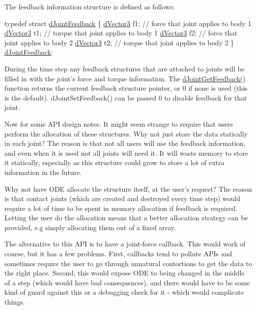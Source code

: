 The feedback information structure is defined as follows:

typedef struct \hyperlink{struct_tao_1_1_ode_1_1_ode_1_1d_joint_feedback}{dJointFeedback} \{ \hyperlink{struct_tao_1_1_ode_1_1_ode_1_1d_vector3}{dVector3} f1; // force that joint applies to body 1 \hyperlink{struct_tao_1_1_ode_1_1_ode_1_1d_vector3}{dVector3} t1; // torque that joint applies to body 1 \hyperlink{struct_tao_1_1_ode_1_1_ode_1_1d_vector3}{dVector3} f2; // force that joint applies to body 2 \hyperlink{struct_tao_1_1_ode_1_1_ode_1_1d_vector3}{dVector3} t2; // torque that joint applies to body 2 \} \hyperlink{struct_tao_1_1_ode_1_1_ode_1_1d_joint_feedback}{dJointFeedback};

During the time step any feedback structures that are attached to joints will be filled in with the joint's force and torque information. The \hyperlink{namespace_tao_1_1_ode_acb665b0ad53713bdc6095725a790aa80}{dJointGetFeedback()} function returns the current feedback structure pointer, or 0 if none is used (this is the default). dJointSetFeedback() can be passed 0 to disable feedback for that joint.

Now for some API design notes. It might seem strange to require that users perform the allocation of these structures. Why not just store the data statically in each joint? The reason is that not all users will use the feedback information, and even when it is used not all joints will need it. It will waste memory to store it statically, especially as this structure could grow to store a lot of extra information in the future.

Why not have ODE allocate the structure itself, at the user's request? The reason is that contact joints (which are created and destroyed every time step) would require a lot of time to be spent in memory allocation if feedback is required. Letting the user do the allocation means that a better allocation strategy can be provided, e.g simply allocating them out of a fixed array.

The alternative to this API is to have a joint-\/force callback. This would work of course, but it has a few problems. First, callbacks tend to pollute APIs and sometimes require the user to go through unnatural contortions to get the data to the right place. Second, this would expose ODE to being changed in the middle of a step (which would have bad consequences), and there would have to be some kind of guard against this or a debugging check for it -\/ which would complicate things. 

